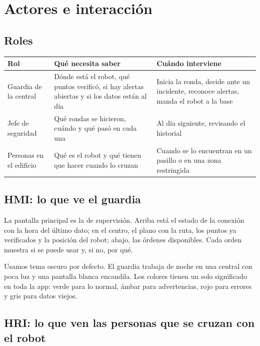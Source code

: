 \section{Actores e interacción}
\label{sec:interaccion}

\subsection{Roles}

\begin{table}[H]
\centering\small
\begin{tabularx}{\textwidth}{@{}l L L@{}}
\toprule
\textbf{Rol} & \textbf{Qué necesita saber} & \textbf{Cuándo interviene} \\
\midrule
Guardia de la central & Dónde está el robot, qué puntos verificó, si hay alertas abiertas y si los datos están al día & Inicia la ronda, decide ante un incidente, reconoce alertas, manda el robot a la base \\
Jefe de seguridad & Qué rondas se hicieron, cuándo y qué pasó en cada una & Al día siguiente, revisando el historial \\
Personas en el edificio & Qué es el robot y qué tienen que hacer cuando lo cruzan & Cuando se lo encuentran en un pasillo o en una zona restringida \\
\bottomrule
\end{tabularx}
\end{table}

\subsection{HMI: lo que ve el guardia}

La pantalla principal es la de supervisión. Arriba está el estado de la conexión con la hora del último dato; en el centro, el plano con la ruta, los puntos ya verificados y la posición del robot; abajo, las órdenes disponibles. Cada orden muestra si se puede usar y, si no, por qué.

Usamos tema oscuro por defecto. El guardia trabaja de noche en una central con poca luz y una pantalla blanca encandila. Los colores tienen un solo significado en toda la app: verde para lo normal, ámbar para advertencias, rojo para errores y gris para datos viejos.

\subsection{HRI: lo que ven las personas que se cruzan con el robot}

